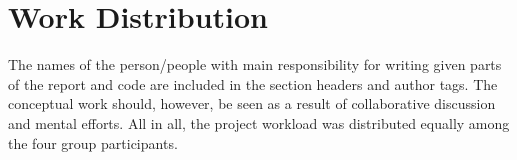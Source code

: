 \section{Work Distribution}
\label{sec:workdistribution}
The names of the person/people with main responsibility for writing given parts of the report and code are included in the section headers and author tags. The conceptual work should, however, be seen as a result of collaborative discussion and mental efforts. All in all, the project workload was distributed equally among the four group participants.